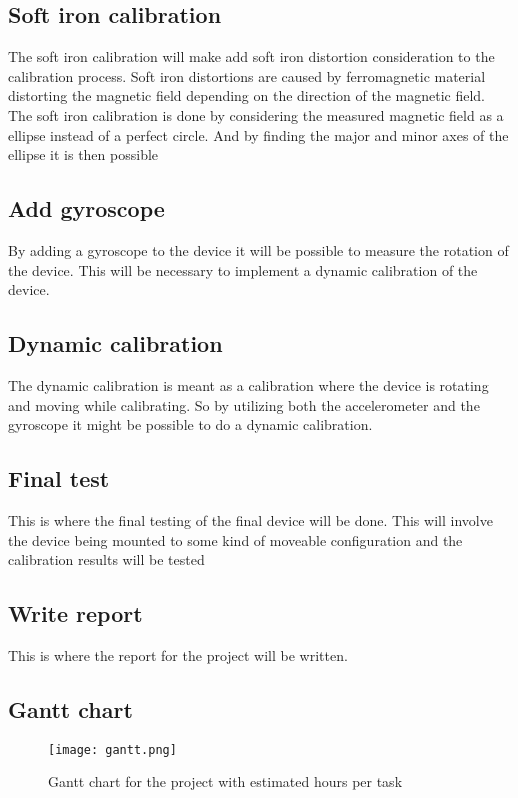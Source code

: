 \section{Soft iron calibration}
The soft iron calibration will make add soft iron distortion consideration to the calibration process. Soft iron distortions are caused by ferromagnetic material distorting the magnetic field depending on the direction of the magnetic field. The soft iron calibration is done by considering the measured magnetic field as a ellipse instead of a perfect circle. And by finding the major and minor axes of the ellipse it is then possible 

\section{Add gyroscope}
By adding a gyroscope to the device it will be possible to measure the rotation of the device. This will be necessary to implement a dynamic calibration of the device.

\section{Dynamic calibration}
The dynamic calibration is meant as a calibration where the device is rotating and moving while calibrating. So by utilizing both the accelerometer and the gyroscope it might be possible to do a dynamic calibration.

\section{Final test}
This is where the final testing of the final device will be done. This will involve the device being mounted to some kind of moveable configuration and the calibration results will be tested

\section{Write report}
This is where the report for the project will be written.

\begin{landscape}
	\chapter{Gantt chart}
	
	\begin{figure}[!h]
		\centering
		\texttt{[image: gantt.png]}
		\caption{Gantt chart for the project with estimated hours per task}
		\label{fig:}
	\end{figure}

\end{landscape}
